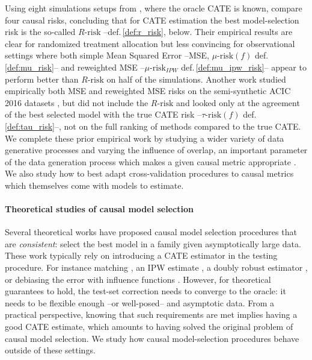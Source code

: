 \documentclass[10pt]{article}
\begin{document}
\begin{multicols}{2}
    Using eight simulations setups from \cite{powers_methods_2018}, where
    the oracle CATE is known, \citet{schuler_comparison_2018} compare four
    causal risks, concluding that for CATE estimation the best
    model-selection risk is the so-called $R\text{-risk}$
    \cite{nie_quasioracle_2017} --def.\,\ref{def:r_risk}, below. Their
    empirical results are clear for randomized treatment allocation but less
    convincing for observational settings where both simple Mean Squared
    Error --MSE, $\mu\text{-risk}(f)$ def.\,\ref{def:mu_risk}-- and
    reweighted MSE --$\mu\text{-risk}_{IPW}$ def.\,\ref{def:mu_ipw_risk}--
    appear to perform better than $R\text{-risk}$ on half of the simulations.
    Another work \cite{alaa_validating_2019} studied empirically both MSE and
    reweighted MSE risks on the semi-synthetic ACIC 2016 datasets
    \cite{dorie_automated_2019}, but did not include the $R\text{-risk}$ and
    looked only at the agreement of the best selected model with the true
    CATE risk --$\tau\text{-risk}(f)$ def.\, \ref{def:tau_risk}--, not on the
    full ranking of methods compared to the true CATE. We complete these
    prior empirical work by studying a wider variety of data generative
    processes and varying the influence of overlap, an important parameter of
    the data generation process which makes a given causal metric appropriate
    \cite{damour_overlap_2020}. We also study how to best adapt
    cross-validation procedures to causal metrics which themselves come with
    models to estimate.

    \paragraph{Theoretical studies of causal model selection}

    Several theoretical works have proposed causal model selection procedures
    that are \emph{consistent}: select the best model in a family given
    asymptotically large data. These work typically rely on introducing a
    CATE estimator in the testing procedure. For instance matching
    \citep{rolling_model_2014}, an IPW estimate
    \citep{gutierrez_causal_2016}, a doubly robust estimator
    \citep{saito_counterfactual_2020}, or debiasing the error with influence
    functions \cite{alaa_validating_2019}. However, for theoretical
    guarantees to hold, the test-set correction needs to converge to the
    oracle: it needs to be flexible enough --or well-posed-- and asymptotic
    data. From a practical perspective, knowing that such requirements are
    met implies having a good CATE estimate, which amounts to having solved
    the original problem of causal model selection. We study how causal
    model-selection procedures behave outside of these settings.


\end{multicols}
\end{document}
